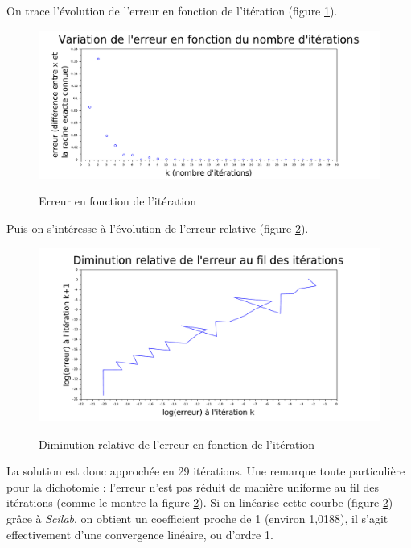 \documentclass[a4paper,10pt]{report}
\begin{document}
On trace l'évolution de l'erreur en fonction de l'itération (figure \ref{graph_dicho}).
\begin{center}
\begin{figure}[H]
\caption{Erreur en fonction de l'itération}
\includegraphics[width=\textwidth]{graphdicho.pdf}
\label{graph_dicho}
\end{figure}
\end{center}

Puis on s'intéresse à l'évolution de l'erreur relative (figure \ref{erreur_dicho}).
\begin{center}
\begin{figure}[H]
\caption{Diminution relative de l'erreur en fonction de l'itération}
\includegraphics[width=\textwidth]{graphdicho_reg.pdf}
\label{erreur_dicho}
\end{figure}
\end{center}

La solution est donc approchée en 29 itérations. Une remarque toute particulière pour la dichotomie : l'erreur n'est pas réduit de manière uniforme au fil des itérations (comme le montre la figure \ref{erreur_dicho}). Si on linéarise cette courbe (figure \ref{erreur_dicho}) grâce à \textit{Scilab}, on obtient un coefficient proche de 1 (environ 1,0188), il s'agit effectivement d'une convergence linéaire, ou d'ordre 1.
\end{document}
